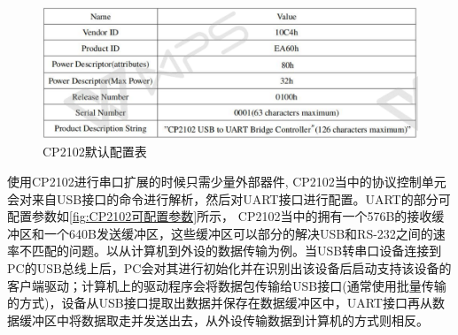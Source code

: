\begin{figure}[!h]
\centering
\includegraphics[width=1.0\textwidth]{./graphics/CP2102DefConf.pdf}
\caption{CP2102默认配置表}\label{CP2102DefaultConfigure}
\end{figure}
	使用CP2102进行串口扩展的时候只需少量外部器件,
	CP2102当中的协议控制单元会对来自USB接口的命令进行解析，然后对UART接口进行配置。UART的部分可配置参数如\autoref{fig:CP2102可配置参数}所示，
	CP2102当中的拥有一个576B的接收缓冲区和一个640B发送缓冲区，这些缓冲区可以部分的解决USB和RS-232之间的速率不匹配的问题。以从计算机到外设的数据传输为例。当USB转串口设备连接到PC的USB总线上后，PC会对其进行初始化并在识别出该设备后启动支持该设备的客户端驱动；计算机上的驱动程序会将数据包传输给USB接口(通常使用批量传输的方式)，设备从USB接口提取出数据并保存在数据缓冲区中，UART接口再从数据缓冲区中将数据取走并发送出去，从外设传输数据到计算机的方式则相反\cite{李雪红2004USB}。	
	
